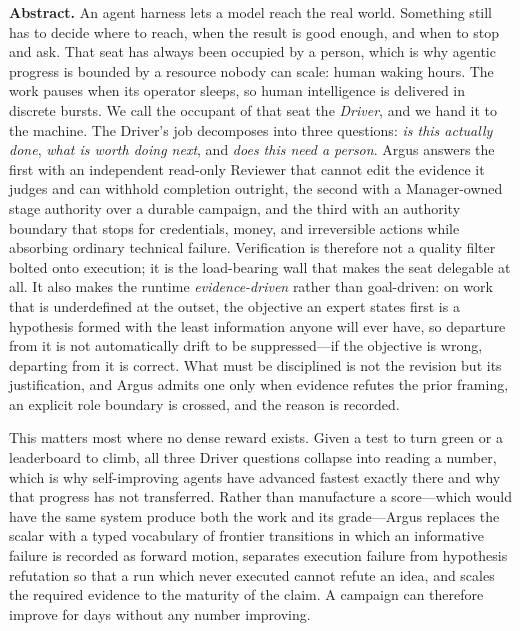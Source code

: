 \documentclass[10pt,letterpaper]{article}
\newcommand{\systemname}{Argus\xspace}
\begin{document}
\begin{abstractbox}
\small
\textbf{Abstract.}
An agent harness lets a model reach the real world. Something still has to decide
where to reach, when the result is good enough, and when to stop and ask. That seat
has always been occupied by a person, which is why agentic progress is bounded by a
resource nobody can scale: human waking hours. The work pauses when its operator
sleeps, so human intelligence is delivered in discrete bursts. We call the occupant
of that seat the \emph{Driver}, and we hand it to the machine. The Driver's job
decomposes into three questions: \emph{is this actually done}, \emph{what is worth
doing next}, and \emph{does this need a person}. \systemname answers the first with
an independent read-only Reviewer that cannot edit the evidence it judges and can
withhold completion outright, the second with a Manager-owned stage authority over
a durable campaign, and the third with an authority boundary that stops for
credentials, money, and irreversible actions while absorbing ordinary technical
failure. Verification is therefore not a quality filter bolted onto execution; it is
the load-bearing wall that makes the seat delegable at all. It also makes the runtime
\emph{evidence-driven} rather than goal-driven: on work that is underdefined at the
outset, the objective an expert states first is a hypothesis formed with the least
information anyone will ever have, so departure from it is not automatically drift to
be suppressed---if the objective is wrong, departing from it is correct. What must be
disciplined is not the revision but its justification, and \systemname{} admits one
only when evidence refutes the prior framing, an explicit role boundary is crossed,
and the reason is recorded.

This matters most where no dense reward exists. Given a test to turn green or a
leaderboard to climb, all three Driver questions collapse into reading a number,
which is why self-improving agents have advanced fastest exactly there and why that
progress has not transferred. Rather than manufacture a score---which would have the
same system produce both the work and its grade---\systemname{} replaces the scalar
with a typed vocabulary of frontier transitions in which an informative failure is
recorded as forward motion, separates execution failure from hypothesis refutation so
that a run which never executed cannot refute an idea, and scales the required
evidence to the maturity of the claim. A campaign can therefore improve for days
without any number improving.


\end{abstractbox}
\end{document}
